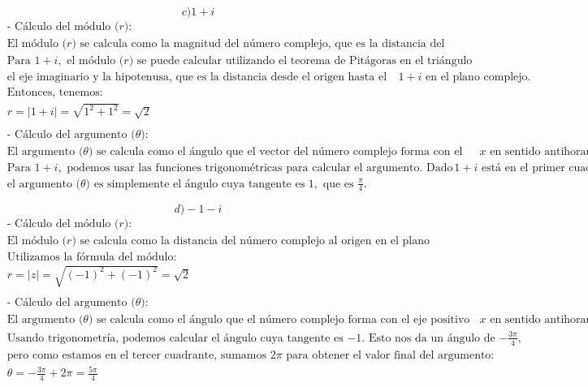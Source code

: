 \documentclass{article}
\begin{document}
\newpage
\[
c) 1+i
\]
\begin{align*}
&\text{- Cálculo del módulo (\(r\)):} \\
&\text{El módulo (\(r\)) se calcula como la magnitud del número complejo, que es la distancia del origen al punto que representa el número en el plano complejo.} \\
&\text{Para } 1+i, \text{ el módulo (\(r\)) se puede calcular utilizando el teorema de Pitágoras en el triángulo rectángulo formado por el eje real,} \\
&\text{el eje imaginario y la hipotenusa, que es la distancia desde el origen hasta el punto } 1+i \text{ en el plano complejo.} \\
&\text{Entonces, tenemos:} \\
& r = |1+i| = \sqrt{1^2 + 1^2} = \sqrt{2} \\
& \\
&\text{- Cálculo del argumento (\(\theta\)):} \\
&\text{El argumento (\(\theta\)) se calcula como el ángulo que el vector del número complejo forma con el eje positivo de las \(x\) en sentido antihorario.} \\
&\text{Para } 1+i, \text{ podemos usar las funciones trigonométricas para calcular el argumento. Dado que } 1+i \text{ está en el primer cuadrante,} \\
&\text{el argumento (\(\theta\)) es simplemente el ángulo cuya tangente es } 1, \text{ que es } \frac{\pi}{4}. \\
& \\
\end{align*}
\[
d) -1-i
\]
\begin{align*}
&\text{- Cálculo del módulo (\(r\)):} \\
&\text{El módulo (\(r\)) se calcula como la distancia del número complejo al origen en el plano complejo.} \\
&\text{Utilizamos la fórmula del módulo:} \\
& r = |z| = \sqrt{(-1)^2 + (-1)^2} = \sqrt{2} \\
& \\
&\text{- Cálculo del argumento (\(\theta\)):} \\
&\text{El argumento (\(\theta\)) se calcula como el ángulo que el número complejo forma con el eje positivo de las \(x\) en sentido antihorario.} \\
&\text{Usando trigonometría, podemos calcular el ángulo cuya tangente es \(-1\). Esto nos da un ángulo de \(-\frac{3\pi}{4}\),} \\
&\text{pero como estamos en el tercer cuadrante, sumamos \(2\pi\) para obtener el valor final del argumento:} \\
& \theta = -\frac{3\pi}{4} + 2\pi = \frac{5\pi}{4} \\
& \\
\end{align*}
\end{document}
